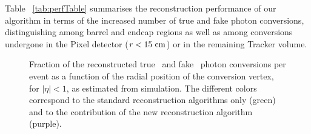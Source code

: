 \documentclass[a4paper]{jpconf}
\begin{document}
 Table ~\ref{tab:perfTable} summarises the reconstruction performance of our algorithm in terms of the increased number of true and fake photon conversions, distinguishing among barrel and endcap regions as well as among conversions undergone in the Pixel detector ($r < 15 ~\rm cm$) or in the remaining Tracker volume.
 
  

\begin{figure}[h]
\begin{center}
\caption{\label{fig:effPerf}
Fraction of the reconstructed true~  and fake~ photon conversions per event as  a function of the radial position of the conversion vertex,   for  $|\eta|<1$, as estimated
from simulation. The different colors correspond to the standard reconstruction algorithms only (green) and to the contribution of the new reconstruction algorithm (purple).}
\end{center}
\end{figure}


\end{document}
